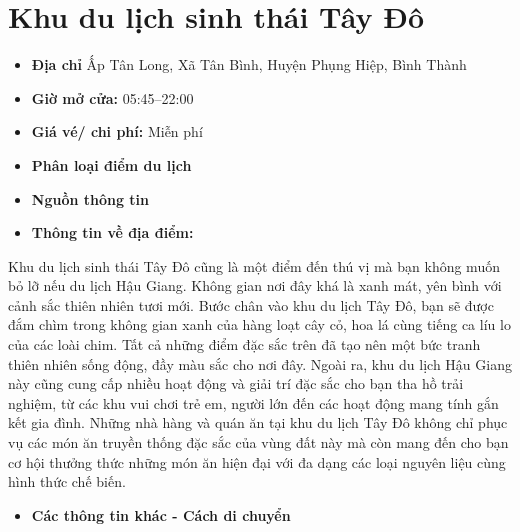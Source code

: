 \documentclass{article}
\begin{document}
\section{Khu du lịch sinh thái Tây Đô}
\begin{itemize}
    \item{\textbf{Địa chỉ}} Ấp Tân Long, Xã Tân Bình, Huyện Phụng Hiệp, Bình Thành
    \item{\textbf{Giờ mở cửa:}} 05:45–22:00
    \item{\textbf{Giá vé/ chi phí:}} Miễn phí
    \item{\textbf{Phân loại điểm du lịch} }
    \item{\textbf{Nguồn thông tin}}
    \item{\textbf{Thông tin về địa điểm:}}
\end{itemize}
Khu du lịch sinh thái Tây Đô cũng là một điểm đến thú vị mà bạn không muốn bỏ lỡ nếu du lịch Hậu Giang. Không gian nơi đây khá là xanh mát, yên bình với cảnh sắc thiên nhiên tươi mới.
Bước chân vào khu du lịch Tây Đô, bạn sẽ được đắm chìm trong không gian xanh của hàng loạt cây cỏ, hoa lá cùng tiếng ca líu lo của các loài chim. Tất cả những điểm đặc sắc trên đã tạo nên một bức tranh thiên nhiên sống động, đầy màu sắc cho nơi đây. Ngoài ra, khu du lịch Hậu Giang này cũng cung cấp nhiều hoạt động và giải trí đặc sắc cho bạn tha hồ trải nghiệm, từ các khu vui chơi trẻ em, người lớn đến các hoạt động mang tính gắn kết gia đình. Những nhà hàng và quán ăn tại khu du lịch Tây Đô không chỉ phục vụ các món ăn truyền thống đặc sắc của vùng đất này mà còn mang đến cho bạn cơ hội thưởng thức những món ăn hiện đại với đa dạng các loại nguyên liệu cùng hình thức chế biến.

\begin{itemize}
    \item{\textbf{Các thông tin khác - Cách di chuyển}}
\end{itemize}
\end{document}
